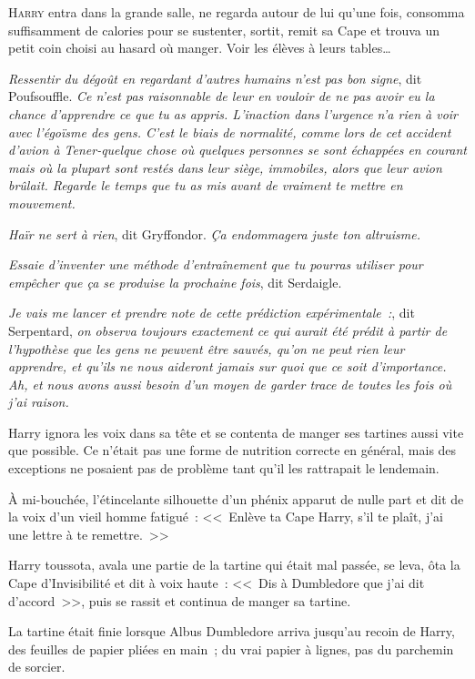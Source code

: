 
\lettrine{H}{arry} entra dans la grande salle, ne regarda autour de lui qu'une fois, consomma suffisamment de calories pour se sustenter, sortit, remit sa Cape et trouva un petit coin choisi au hasard où manger. Voir les élèves à leurs tables…

\emph{Ressentir du dégoût en regardant d'autres humains n'est pas bon signe}, dit Poufsouffle. \emph{Ce n'est pas raisonnable de leur en vouloir de ne pas avoir eu la chance d'apprendre ce que tu as appris. L'inaction dans l'urgence n'a rien à voir avec l'égoïsme des gens. C'est le biais de normalité, comme lors de cet accident d'avion à Tener-quelque chose où quelques personnes se sont échappées en courant mais où la plupart sont restés dans leur siège, immobiles, alors que leur avion brûlait. Regarde le temps que tu as mis avant de vraiment te mettre en mouvement.}

\emph{Haïr ne sert à rien}, dit Gryffondor. \emph{Ça endommagera juste ton altruisme.}

\emph{Essaie d'inventer une méthode d'entraînement que tu pourras utiliser pour empêcher que ça se produise la prochaine fois}, dit Serdaigle.

\emph{Je vais me lancer et prendre note de cette prédiction expérimentale~:}, dit Serpentard, \emph{on observa toujours exactement ce qui aurait été prédit à partir de l'hypothèse que les gens ne peuvent être sauvés, qu'on ne peut rien leur apprendre, et qu'ils ne nous aideront jamais sur quoi que ce soit d'importance. Ah, et nous avons aussi besoin d'un moyen de garder trace de toutes les fois où j'ai raison.}

Harry ignora les voix dans sa tête et se contenta de manger ses tartines aussi vite que possible. Ce n'était pas une forme de nutrition correcte en général, mais des exceptions ne posaient pas de problème tant qu'il les rattrapait le lendemain.

À mi-bouchée, l'étincelante silhouette d'un phénix apparut de nulle part et dit de la voix d'un vieil homme fatigué~: <<~Enlève ta Cape Harry, s'il te plaît, j'ai une lettre à te remettre.~>>

Harry toussota, avala une partie de la tartine qui était mal passée, se leva, ôta la Cape d'Invisibilité et dit à voix haute~: <<~Dis à Dumbledore que j'ai dit d'accord~>>, puis se rassit et continua de manger sa tartine.

La tartine était finie lorsque Albus Dumbledore arriva jusqu'au recoin de Harry, des feuilles de papier pliées en main~; du vrai papier à lignes, pas du parchemin de sorcier.

